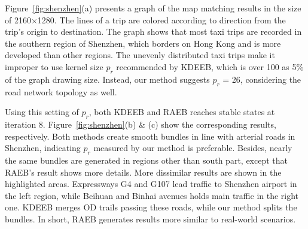 Figure~\ref{fig:shenzhen}(a) presents a graph of the map matching results in the size of 2160$\times$1280.
The lines of a trip are colored according to direction from the trip's origin to destination.
The graph shows that most taxi trips are recorded in the southern region of Shenzhen, which borders on Hong Kong and is more developed than other regions.
The unevenly distributed taxi trips make it improper to use kernel size $p_r$ recommended by KDEEB, which is over 100 as 5\% of the graph drawing size.
Instead, our method suggests $p_r$ = 26, considering the road network topology as well.

Using this setting of $p_r$, both KDEEB and RAEB reaches stable states at iteration 8.
Figure~\ref{fig:shenzhen}(b) \& (c) show the corresponding results, respectively.
Both methods create smooth bundles in line with arterial roads in Shenzhen, indicating $p_r$ measured by our method is preferable.
Besides, nearly the same bundles are generated in regions other than south part, except that RAEB's result shows more details.
More dissimilar results are shown in the highlighted areas.
Expressways G4 and G107 lead traffic to Shenzhen airport in the left region, while Beihuan and Binhai avenues holds main traffic in the right one.
KDEEB merges OD trails passing these roads, while our method splits the bundles.
In short, RAEB generates results more similar to real-world scenarios.